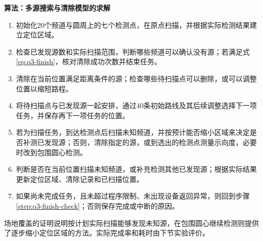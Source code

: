 \FloatBarrier


\Needspace{70mm}
\par\noindent\begin{minipage}{\linewidth}
\label{alg:q3-search}
\textbf{算法\thealgorithm：多源搜索与清除模型的求解}
\small
\begin{enumerate}[label=\arabic*.,ref=\arabic*,leftmargin=2em,itemsep=2pt,topsep=4pt]
  \item 初始化20个频道与圆周上的七个检测点，在原点扫描，并根据实际检测结果建立定位区域。
  \item\label{step:q3-finish-check} 检查已发现源数和实际扫描范围，判断哪些频道可以确认没有源；若满足式\eqref{eq:q3-finish}，核对清除成功次数并结束任务。
  \item 清除在当前位置满足距离条件的源；检查哪些待扫描点可以删除，或可以调整位置以缩短路程。
  \item 将待扫描点与已发现源一起安排，通过40条初始路线及其后续调整选择下一项任务，并保存再下一项任务的位置。
  \item 若为扫描任务，到达检测点后扫描未知频道，并按预计能否缩小区域来决定是否补测已发现源；否则，清除指定的源，或到选出的检测点测量示向度，必要时改到包围圆心检测。
  \item 判断是否在当前位置扫描未知频道，或补充检测其他已发现源；根据实际结果更新定位区域、清除记录和已扫描位置。
  \item 如果尚未完成任务，且未超过程序限制、未出现设备返回异常，则回到步骤\ref{step:q3-finish-check}；否则保存完成或中断的原因。
\end{enumerate}
\end{minipage}\par


场地覆盖的证明说明按计划实际扫描能够发现未知源，在包围圆心继续检测则提供了逐步缩小定位区域的方法。实际完成率和耗时由下节实验评价。
